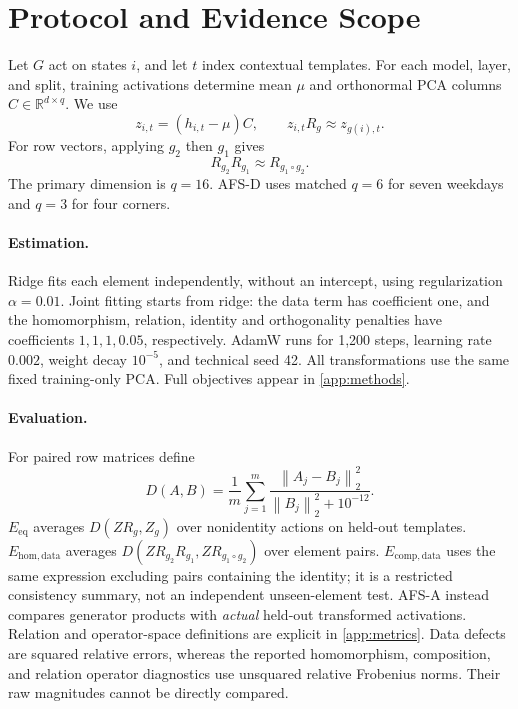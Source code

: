 \documentclass{article}
\newcommand{\R}{\mathbb{R}}
\newcommand{\norm}[1]{\left\lVert #1\right\rVert}
\newcommand{\Eeq}{E_{\mathrm{eq}}}
\newcommand{\Ehom}{E_{\mathrm{hom,data}}}
\newcommand{\Ecomp}{E_{\mathrm{comp,data}}}
\begin{document}
\section{Protocol and Evidence Scope}
\label{sec:setup}
Let $G$ act on states $i$, and let $t$ index contextual templates. For each model, layer, and split, training activations determine mean $\mu$ and orthonormal PCA columns $C\in\R^{d\times q}$. We use
\begin{equation}
 z_{i,t}=(h_{i,t}-\mu)C,\qquad z_{i,t}R_g\approx z_{g(i),t}.
\end{equation}
For row vectors, applying $g_2$ then $g_1$ gives
\begin{equation}
 R_{g_2}R_{g_1}\approx R_{g_1\circ g_2}.
 \label{eq:convention}
\end{equation}
The primary dimension is $q=16$. AFS-D uses matched $q=6$ for seven weekdays and $q=3$ for four corners.

\paragraph{Estimation.}
Ridge fits each element independently, without an intercept, using regularization $\alpha=0.01$. Joint fitting starts from ridge: the data term has coefficient one, and the homomorphism, relation, identity and orthogonality penalties have coefficients $1,1,1,0.05$, respectively. AdamW runs for 1,200 steps, learning rate $0.002$, weight decay $10^{-5}$, and technical seed 42. All transformations use the same fixed training-only PCA. Full objectives appear in \cref{app:methods}.

\paragraph{Evaluation.}
For paired row matrices define
\begin{equation}
 D(A,B)=\frac{1}{m}\sum_{j=1}^m
 \frac{\norm{A_j-B_j}_2^2}{\norm{B_j}_2^2+10^{-12}}.
 \label{eq:D}
\end{equation}
$\Eeq$ averages $D(ZR_g,Z_g)$ over nonidentity actions on held-out templates. $\Ehom$ averages $D(ZR_{g_2}R_{g_1},ZR_{g_1\circ g_2})$ over element pairs. $\Ecomp$ uses the same expression excluding pairs containing the identity; it is a restricted consistency summary, not an independent unseen-element test. AFS-A instead compares generator products with \emph{actual} held-out transformed activations. Relation and operator-space definitions are explicit in \cref{app:metrics}. Data defects are squared relative errors, whereas the reported homomorphism, composition, and relation operator diagnostics use unsquared relative Frobenius norms. Their raw magnitudes cannot be directly compared.
\end{document}
